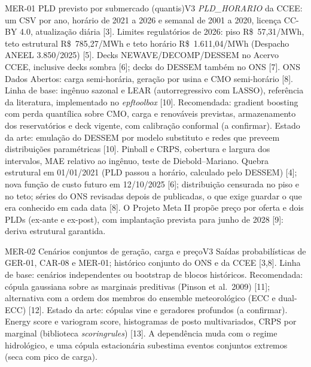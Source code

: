 \begin{ficha}{MER-01 \textperiodcentered{} PLD previsto por submercado (quantis)}{V3}
 \emph{PLD\_HORARIO} da CCEE: um CSV por ano, horário de 2021 a
2026 e semanal de 2001 a 2020, licença CC-BY 4.0, atualização diária [3].
Limites regulatórios de 2026: piso R\$~57,31/MWh, teto estrutural
R\$~785,27/MWh e teto horário R\$~1.611,04/MWh (Despacho ANEEL 3.850/2025)
[5]. Decks NEWAVE/DECOMP/DESSEM no Acervo CCEE, inclusive decks sombra [6];
decks do DESSEM também no ONS [7]. ONS Dados Abertos: carga semi-horária,
geração por usina e CMO semi-horário [8].
 Linha de base: ingênuo sazonal e LEAR (autorregressivo
com LASSO), referência da literatura, implementado no \emph{epftoolbox} [10].
Recomendada: gradient boosting com perda quantílica sobre CMO, carga e
renováveis previstas, armazenamento dos reservatórios e deck vigente, com
calibração conformal (a confirmar). Estado da arte: emulação do DESSEM por
modelo substituto e redes que preveem distribuições paramétricas [10].
 Pinball e CRPS, cobertura e largura dos intervalos, MAE
relativo ao ingênuo, teste de Diebold--Mariano.
 Quebra estrutural em 01/01/2021 (PLD passou a horário,
calculado pelo DESSEM) [4]; nova função de custo futuro em 12/10/2025 [6];
distribuição censurada no piso e no teto; séries do ONS revisadas depois de
publicadas, o que exige guardar o que era conhecido em cada data [8]. O
Projeto Meta II propõe preço por oferta e dois PLDs (ex-ante e ex-post), com
implantação prevista para junho de 2028 [9]: deriva estrutural garantida.
\end{ficha}

\begin{ficha}{MER-02 \textperiodcentered{} Cenários conjuntos de geração, carga e preço}{V3}
 Saídas probabilísticas de GER-01, CAR-08 e MER-01; histórico
conjunto do ONS e da CCEE [3,8].
 Linha de base: cenários independentes ou bootstrap de
blocos históricos. Recomendada: cópula gaussiana sobre as marginais
preditivas (Pinson et al.\ 2009) [11]; alternativa com a ordem dos membros do
ensemble meteorológico (ECC e dual-ECC) [12]. Estado da arte: cópulas vine e
geradores profundos (a confirmar).
 Energy score e variogram score, histogramas de posto
multivariados, CRPS por marginal (biblioteca \emph{scoringrules}) [13].
 A dependência muda com o regime hidrológico, e uma cópula
estacionária subestima eventos conjuntos extremos (seca com pico de carga).
\end{ficha}

